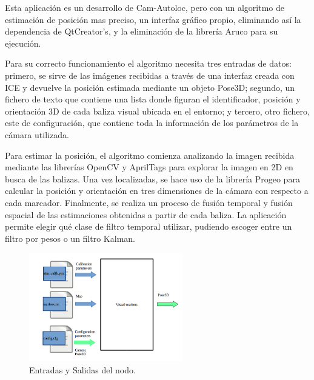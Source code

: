 \hspace{1cm} Esta aplicación es un desarrollo de Cam-Autoloc, pero con un algoritmo de estimación de posición mas preciso, un interfaz gráfico propio, eliminando así la dependencia de QtCreator's, y la eliminación de la librería Aruco para su ejecución. 

\hspace{1cm} Para su correcto funcionamiento el algoritmo necesita tres entradas de datos: primero, se sirve de las imágenes recibidas a través de una interfaz creada con ICE y devuelve la posición estimada mediante un objeto Pose3D; segundo, un fichero de texto que contiene una lista donde figuran el identificador, posición y orientación 3D de cada baliza visual ubicada en el entorno; y tercero, otro fichero, este de configuración, que contiene toda la información de los parámetros de la cámara utilizada. 

\hspace{1cm} Para estimar la posición, el algoritmo comienza analizando la imagen recibida mediante las librerías OpenCV y AprilTags para explorar la imagen en 2D en busca de las balizas. Una vez localizadas, se hace uso de la librería Progeo para calcular la posición y orientación en tres dimensiones de la cámara con respecto a cada marcador. Finalmente, se realiza un proceso de fusión temporal y fusión espacial de las estimaciones obtenidas a partir de cada baliza. La aplicación permite elegir qué clase de filtro temporal utilizar, pudiendo escoger entre un filtro por pesos o un filtro Kalman.

\begin{figure}[H]
	\begin{center}
		\includegraphics[width=0.6\textwidth]{imag/IMG23.png}
				\caption{Entradas y Salidas del nodo.} 
	\label{fig:Entradas y Salidas del nodo.}	
	\end{center}
\end{figure}
